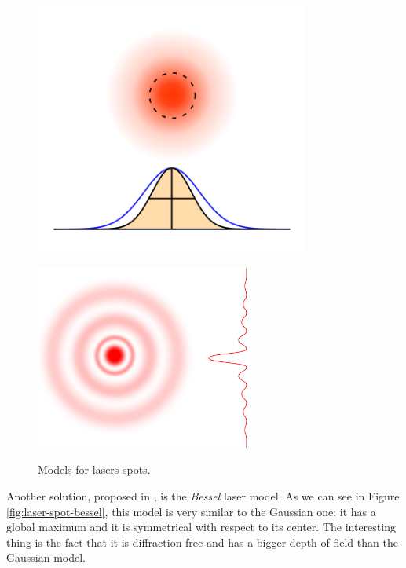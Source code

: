   \begin{figure}[t!]
  \centering
    \begin{minipage}[c]{.48\textwidth}
      \centering
      \includegraphics[width=0.8\textwidth]{./images/tech/laser-gauss.png}
      \label{fig:laser-spot-gauss}
    \end{minipage}
    \hfill
    \begin{minipage}[c]{.48\textwidth}
      \centering
      \includegraphics[angle=270, origin=c, width=0.64\textwidth]{./images/tech/laser-bessel.png}
      \label{fig:laser-spot-bessel}
    \end{minipage}
    \caption{Models for lasers spots.}
    \label{fig:laser-spot-models}
  \end{figure}

Another solution, proposed in \cite{saleh2013fundamentals}, is the \textit{Bessel} laser model. As we can see in Figure \ref{fig:laser-spot-bessel}, this model is very similar to the Gaussian one: it has a global maximum and it is symmetrical with respect to its center. The interesting thing is the fact that it is diffraction free and has a bigger depth of field than the Gaussian model. \\

